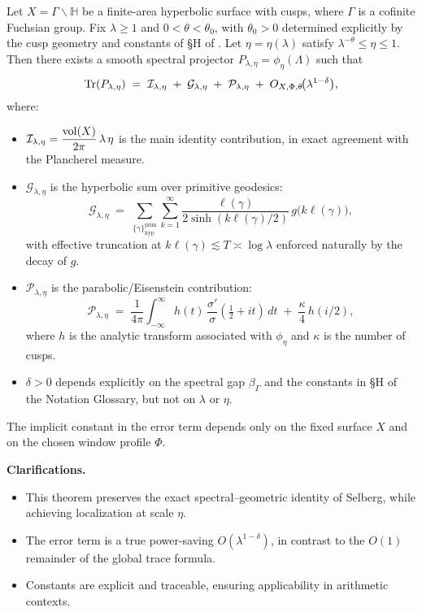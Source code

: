 \medskip

\begin{theorem}\label{thm:intro-localized-trace}
Let $X=\Gamma\backslash\mathbb{H}$ be a finite-area hyperbolic surface with cusps,
where $\Gamma$ is a cofinite Fuchsian group.
Fix $\lambda\ge 1$ and $0<\theta<\theta_0$, with $\theta_0>0$ determined explicitly
by the cusp geometry and constants of \S H of .
Let $\eta=\eta(\lambda)$ satisfy $\lambda^{-\theta}\le \eta\le 1$.
Then there exists a smooth spectral projector $P_{\lambda,\eta}=\phi_\eta(\Lambda)$
such that
\[
  \operatorname{Tr}(P_{\lambda,\eta})
  \;=\;
  \mathcal{I}_{\lambda,\eta}
  \;+\;
  \mathcal{G}_{\lambda,\eta}
  \;+\;
  \mathcal{P}_{\lambda,\eta}
  \;+\;
  O_{X,\Phi,\theta}\!\big(\lambda^{1-\delta}\big),
\]
where:
\begin{itemize}
  \item $\mathcal{I}_{\lambda,\eta} = \dfrac{\operatorname{vol}(X)}{2\pi}\,\lambda\,\eta$
        is the main identity contribution, in exact agreement with the Plancherel measure.
  \item $\mathcal{G}_{\lambda,\eta}$ is the hyperbolic sum over primitive geodesics:
  \[
    \mathcal{G}_{\lambda,\eta}
    \;=\;
    \sum_{\{\gamma\}^{\mathrm{prim}}_{\mathrm{hyp}}}
    \sum_{k=1}^\infty
    \frac{\ell(\gamma)}{2\sinh(k\ell(\gamma)/2)}\,
    g\!\big(k\ell(\gamma)\big),
  \]
  with effective truncation at $k\ell(\gamma)\lesssim T\asymp \log\lambda$
  enforced naturally by the decay of $g$.
  \item $\mathcal{P}_{\lambda,\eta}$ is the parabolic/Eisenstein contribution:
  \[
    \mathcal{P}_{\lambda,\eta}
    \;=\;
    \frac{1}{4\pi}\int_{-\infty}^{\infty}
      h(t)\,\frac{\sigma'}{\sigma}(\tfrac{1}{2}+it)\,dt
    \;+\;
    \frac{\kappa}{4}\,h(i/2),
  \]
  where $h$ is the analytic transform associated with $\phi_\eta$
  and $\kappa$ is the number of cusps.
  \item $\delta>0$ depends explicitly on the spectral gap $\beta_\Gamma$
        and the constants in \S H of the Notation Glossary,
        but not on $\lambda$ or $\eta$.
\end{itemize}
The implicit constant in the error term depends only on the fixed surface $X$
and on the chosen window profile $\Phi$.
\end{theorem}

\medskip

\noindent\textbf{Clarifications.}
\begin{itemize}
  \item This theorem preserves the exact spectral–geometric identity of Selberg,
        while achieving localization at scale $\eta$.
  \item The error term is a true power-saving $O(\lambda^{1-\delta})$,
        in contrast to the $O(1)$ remainder of the global trace formula.
  \item Constants are explicit and traceable, ensuring applicability in arithmetic contexts.
\end{itemize}

